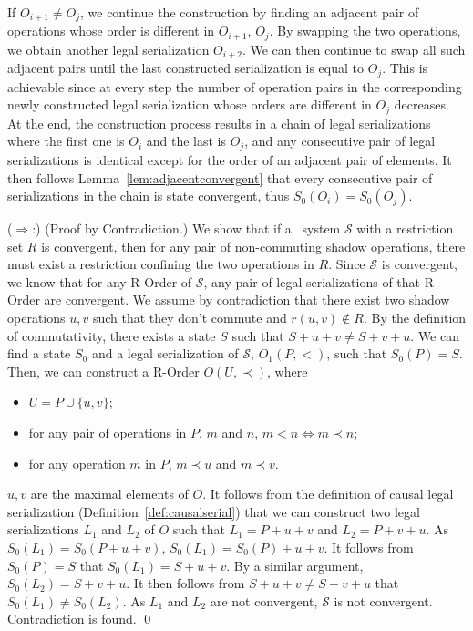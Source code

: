 If $O_{i+1} \neq O_j$, we continue the construction by finding
an adjacent pair of operations whose order is different in $O_{i+1}$, $O_j$. By swapping
the two operations, we obtain another legal serialization $O_{i+2}$. We can then continue to swap
all such adjacent pairs until the last constructed serialization
is equal to $O_j$. This is achievable since at every step the number of operation pairs in the corresponding newly constructed legal serialization 
whose orders are different in $O_j$ decreases.
At the end, the construction process results in a chain of legal
serializations where the first one is $O_i$ and the last is $O_j$, and any consecutive pair of legal serializations
is identical except for the order of an adjacent pair of elements. It then follows
Lemma~\ref{lem:adjacentconvergent} that every consecutive pair of
serializations in the chain is state convergent, thus $S_0(O_i) = S_0(O_j)$.


\noindent ($\Rightarrow$:) (Proof by Contradiction.) We show that if a \PRCAJ\ system $\mathscr{S}$ 
with a restriction set $R$ is convergent, then for any pair of non-commuting shadow operations, there must exist
a restriction confining the two operations in $R$. Since $\mathscr{S}$ is convergent, we know that for any R-Order of $\mathscr{S}$, any pair of legal serializations of that R-Order are convergent. We assume by contradiction that there exist two
shadow operations $u, v$ such that they don't commute and $r(u, v) \not\in R$. By the definition of commutativity, there exists
a state $S$ such that $S+u+v \neq S+v+u$. We can find a state $S_0$ and a legal serialization of $\mathscr{S}$, $O_1(P, <)$, such that $S_0(P) = S$. Then,
we can construct a R-Order $O(U, \prec)$, where 

\begin{itemize}
\item $U = P\cup\{u, v\}$;
\item for any pair of operations in $P$, $m$ and $n$, $m<n \Longleftrightarrow m\prec n$;
\item for any operation $m$ in $P$, $m \prec u$ and $m \prec v$.
\end{itemize}  

$u, v$ are the maximal elements of $O$. It follows from the definition of causal legal serialization (Definition~\ref{def:causalserial}) that
we can construct two legal serializations $L_1$ and $L_2$ of $O$ such that $L_1 = P + u + v$ and $L_2 = P + v + u$. 
As $S_0(L_1) = S_0(P + u +v)$, $S_0(L_1) = S_0(P) + u +v$. It follows from $S_0(P) = S$ that $S_0(L_1) = S+u+v$. By a similar argument, $S_0(L_2) = S+v+u$.
It then follows from $S+u+v \neq S+v+u$ that $S_0(L_1)\neq S_0(L_2)$. As $L_1$ and $L_2$ are not convergent, $\mathscr{S}$ is not convergent. Contradiction is
found.
\qed

